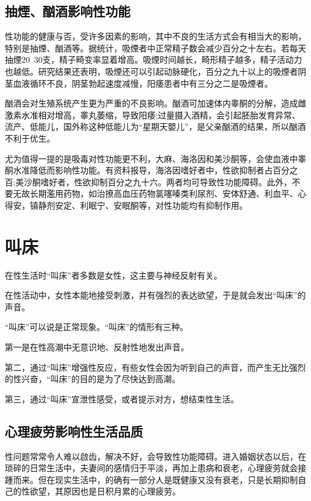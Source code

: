 \documentclass[12pt,UTF8]{ctexbook}
\begin{document}
\section{抽煙、酗酒影响性功能}

性功能的健康与否，受许多因素的影响，其中不良的生活方式会有相当大的影响，特别是抽煙、酗酒等。据统计，吸煙者中正常精子数会减少百分之十左右。若每天抽煙20~30支，精子畸变率显着增高。吸煙时间越长，畸形精子越多，精子活动力也越低。研究结果还表明，吸煙还可以引起动脉硬化，百分之九十以上的吸煙者阴茎血液循环不良，阴茎勃起速度减慢，阳痿患者中有三分之二是吸煙者。

酗酒会对生殖系统产生更为严重的不良影响。酗酒可加速体内睾酮的分解，造成雌激素水准相对增高，睾丸萎缩，导致阳痿;过量摄入酒精，会引起胚胎发育异常、流产、低能儿，国外称这种低能儿为“星期天嬰儿”，是父亲酗酒的结果，所以酗酒不利于优生。

尤为值得一提的是吸毒对性功能更不利，大麻、海洛因和美沙酮等，会使血液中睾酮水准降低而影响性功能。有资料报导，海洛因嗜好者中，性欲抑制者占百分之百;美沙酮嗜好者，性欲抑制百分之九十六。两者均可导致性功能障碍。此外，不要无故长期濫用药物，如治撩高血压药物氯噻嗪类利尿剂、安体舒通、利血平、心得安，镇静剂安定、利眠宁、安眠酮等，对性功能均有抑制作用。

\chapter{叫床}

在性生活时“叫床”者多数是女性，这主要与神经反射有关。

在性活动中，女性本能地接受刺激，并有强烈的表达欲望，于是就会发出“叫床”的声音。

“叫床”可以说是正常现象。“叫床”的情形有三种。

第一是在性高潮中无意识地、反射性地发出声音。

第二，通过“叫床”增强性反应，有些女性会因为听到自己的声音，而产生无比强烈的性兴奋，“叫床”的目的是为了尽快达到高潮。

第三，通过“叫床”宣泄性感受，或者提示对方，想结束性生活。

\section{心理疲劳影响性生活品质}

性问题常常令人难以啟齿，解决不好，会导致性功能障碍。进入婚姻状态以后，在琐碎的日常生活中，夫妻间的感情归于平淡，再加上患病和衰老，心理疲劳就会接踵而来。但在现实生活中，的确有一部分人是既健康又没有衰老，只是长期抑制自己的性欲望，其原因也是日积月累的心理疲劳。
\end{document}
